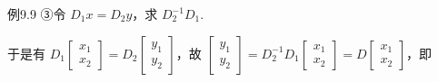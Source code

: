 \begin{fcard}{例9.9}
③令 $D_1x=D_2y$，求 $D_2^{-1}D_1$.

于是有 $D_1\begin{bmatrix}x_1\\x_2\end{bmatrix}=D_2\begin{bmatrix}y_1\\y_2\end{bmatrix}$，故 $\begin{bmatrix}y_1\\y_2\end{bmatrix}=D_2^{-1}D_1\begin{bmatrix}x_1\\x_2\end{bmatrix}=D\begin{bmatrix}x_1\\x_2\end{bmatrix}$，即


\end{fcard}
